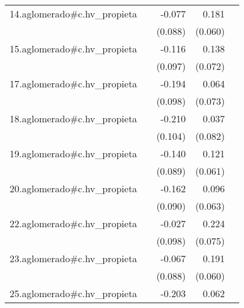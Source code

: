 {\begin{longtable}{l*{4}{D{.}{.}{-1}}}
\addlinespace
14.aglomerado#c.hv\_propieta&                     &      -0.077         &       0.181\sym{**} &                     \\
            &                     &     (0.088)         &     (0.060)         &                     \\
\addlinespace
15.aglomerado#c.hv\_propieta&                     &      -0.116         &       0.138         &                     \\
            &                     &     (0.097)         &     (0.072)         &                     \\
\addlinespace
17.aglomerado#c.hv\_propieta&                     &      -0.194\sym{*}  &       0.064         &                     \\
            &                     &     (0.098)         &     (0.073)         &                     \\
\addlinespace
18.aglomerado#c.hv\_propieta&                     &      -0.210\sym{*}  &       0.037         &                     \\
            &                     &     (0.104)         &     (0.082)         &                     \\
\addlinespace
19.aglomerado#c.hv\_propieta&                     &      -0.140         &       0.121\sym{*}  &                     \\
            &                     &     (0.089)         &     (0.061)         &                     \\
\addlinespace
20.aglomerado#c.hv\_propieta&                     &      -0.162         &       0.096         &                     \\
            &                     &     (0.090)         &     (0.063)         &                     \\
\addlinespace
22.aglomerado#c.hv\_propieta&                     &      -0.027         &       0.224\sym{**} &                     \\
            &                     &     (0.098)         &     (0.075)         &                     \\
\addlinespace
23.aglomerado#c.hv\_propieta&                     &      -0.067         &       0.191\sym{**} &                     \\
            &                     &     (0.088)         &     (0.060)         &                     \\
\addlinespace
25.aglomerado#c.hv\_propieta&                     &      -0.203\sym{*}  &       0.062         &                     \\

\end{longtable}}
